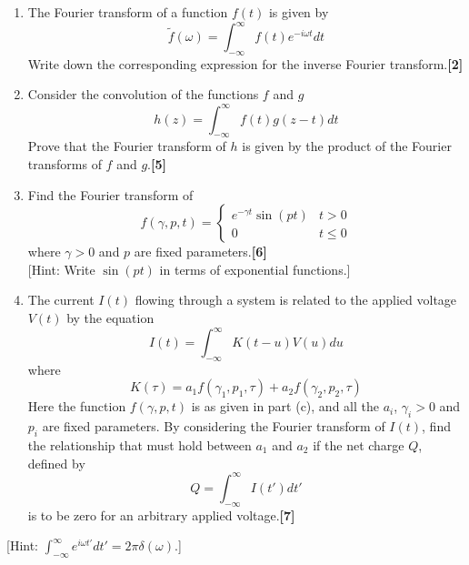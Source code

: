 \documentclass[a4paper]{article}
\begin{document}
\begin{qns}\leavevmode
\begin{enumerate}[label=(\alph*)]
\item The Fourier transform of a function $f(t)$ is given by
$$\tilde{f}(\omega)=\int_{-\infty}^\infty f(t)e^{-i\omega t}dt$$
Write down the corresponding expression for the inverse Fourier transform.\hfill\textbf{[2]}
\item Consider the convolution of the functions $f$ and $g$
$$h(z)=\int_{-\infty}^\infty f(t)g(z-t)dt$$
Prove that the Fourier transform of $h$ is given by the product of the Fourier
transforms of $f$ and $g$.\hfill\textbf{[5]}
\item Find the Fourier transform of
$$f(\gamma,p,t)=
\left\{
        \begin{array}{ll}
      e^{-\gamma t}\sin(pt) & t>0 \\
      0 & t\leq 0
        \end{array}
    \right.$$
    where $\gamma>0$ and $p$ are fixed parameters.\hfill\textbf{[6]}\\[5pt]
    [Hint: Write $\sin(pt)$ in terms of exponential functions.]
\item  The current $I(t)$ flowing through a system is related to the applied voltage $V (t)$ by the equation  
$$I(t)=\int_{-\infty}^\infty K(t-u)V(u)du$$
where
$$K(\tau)=a_1f(\gamma_1,p_1,\tau)+a_2f(\gamma_2,p_2,\tau)$$
Here the function $f(\gamma,p,t)$ is as given in part (c), and all the $a_i$, $\gamma_i>0$ and $p_i$ are fixed parameters. By considering the Fourier transform of $I(t)$, find the relationship that must hold between $a_1$ and $a_2$ if the net charge $Q$, defined by
$$Q=\int_{-\infty}^\infty I(t')dt'$$
is to be zero for an arbitrary applied voltage.\hfill\textbf{[7]}
\end{enumerate}
[Hint: $\int_{-\infty}^\infty e^{i\omega t'}dt'=2\pi\delta(\omega)$.]
\end{qns}
\end{document}
